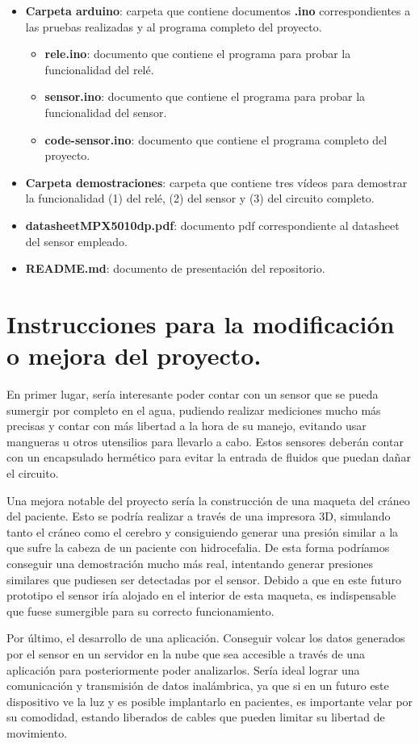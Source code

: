 \begin{itemize}
\begin{itemize}
    \end{itemize}
    \item \textbf{Carpeta arduino}: carpeta que contiene documentos \textbf{.ino} correspondientes a las pruebas realizadas y al programa completo del proyecto.
    \begin{itemize}
        \item \textbf{rele.ino}: documento que contiene el programa para probar la funcionalidad del relé.
        \item \textbf{sensor.ino}: documento que contiene el programa para probar la funcionalidad del sensor.
        \item \textbf{code-sensor.ino}: documento que contiene el programa completo del proyecto.
    \end{itemize}
    \item \textbf{Carpeta demostraciones}: carpeta que contiene tres vídeos para demostrar la funcionalidad (1) del relé, (2) del sensor y (3) del circuito completo.
    \item \textbf{datasheetMPX5010dp.pdf}: documento pdf correspondiente al datasheet del sensor empleado.
    \item \textbf{README.md}: documento de presentación del repositorio.
\end{itemize}


\section{Instrucciones para la modificación o mejora del proyecto.}

En primer lugar, sería interesante poder contar con un sensor que se pueda sumergir por completo en el agua, pudiendo realizar mediciones mucho más precisas y contar con más libertad a la hora de su manejo, evitando usar mangueras u otros utensilios para llevarlo a cabo. Estos sensores deberán contar con un encapsulado hermético para evitar la entrada de fluidos que puedan dañar el circuito.

Una mejora notable del proyecto sería la construcción de una maqueta del cráneo del paciente. Esto se podría realizar a través de una impresora 3D, simulando tanto el cráneo como el cerebro y consiguiendo generar una presión similar a la que sufre la cabeza de un paciente con hidrocefalia. De esta forma podríamos conseguir una demostración mucho más real, intentando generar presiones similares que pudiesen ser detectadas por el sensor. Debido a que en este futuro prototipo el sensor iría alojado en el interior de esta maqueta, es indispensable que fuese sumergible para su correcto funcionamiento.

Por último, el desarrollo de una aplicación. Conseguir volcar los datos generados por el sensor en un servidor en la nube que sea accesible a través de una aplicación para posteriormente poder analizarlos. Sería ideal lograr una comunicación y transmisión de datos inalámbrica, ya que si en un futuro este dispositivo ve la luz y es posible implantarlo en pacientes, es importante velar por su comodidad, estando liberados de cables que pueden limitar su libertad de movimiento.
